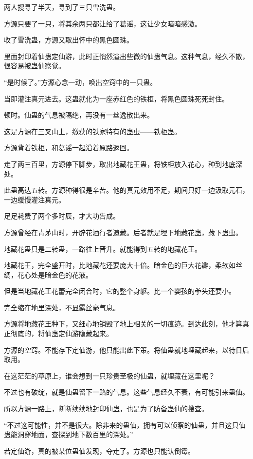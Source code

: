 \begin{this_body}
两人搜寻了半天，寻到了三只雪洗蛊。

方源只要了一只，将其余两只都让给了葛谣，这让少女暗暗感激。

收了雪洗蛊，方源又取出怀中的黑色圆珠。

里面封印着仙蛊定仙游，此时正悄然溢出些微的仙蛊气息。这种气息，经久不散，很容易被蛊仙察觉。

“是时候了。”方源心念一动，唤出空窍中的一只蛊。

当即灌注真元进去。这蛊就化为一座赤红色的铁柜，将黑色圆珠死死封住。

顿时。仙蛊的气息被隔绝，再没有一丝逸散出来。

这是方源在三叉山上，缴获的铁家特有的蛊虫——铁柜蛊。

方源背着铁柜，和葛谣一起沿着原路返回。

走了两三百里，方源停下脚步，取出地藏花王蛊，将铁柜放入花心，种到地底深处。

此蛊高达五转。方源种得很是辛苦。他的真元效用不足，期间只好一边汲取元石，一边缓慢灌注真元。

足足耗费了两个多时辰，才大功告成。

方源曾经在青茅山时，开辟花酒行者遗藏。后者就是埋下地藏花蛊，藏下蛊虫。

地藏花蛊只是二转蛊，一路往上晋升。就能得到五转的地藏花王。

地藏花王，完全盛开时，比地藏花还要庞大十倍。暗金色的巨大花瓣，柔软如丝绸，花心处是暗金色的花液。

但是当地藏花王花蕾完全闭合时，它的整个身躯。比一个婴孩的拳头还要小。

完全缩在地里深处，不显露丝毫气息。

方源将地藏花王种下，又细心地销毁了地上相关的一切痕迹。到达此刻，他才算真正彻底的，将仙蛊定仙游隐藏起来。

方源的空窍。不能存下定仙游，他只能出此下策。将仙蛊就地埋藏起来，以待日后取用。

在这茫茫的草原上，谁会想到一只珍贵至极的仙蛊，就埋藏在这里呢？

不过也有破绽，就是仙蛊留下一路的气息。这些气息经久不衰，有可能引来蛊仙。

所以方源一路上，断断续续地封印仙蛊，也是为了防备蛊仙的搜查。

“不过这可能性，并不是很大。除非来的蛊仙，拥有可以侦察的仙蛊，并且这只仙蛊能洞穿地面，查探到地下数百里的深处。”

若定仙游，真的被某位蛊仙发现，夺走了。方源也只能认倒霉。


\end{this_body}
